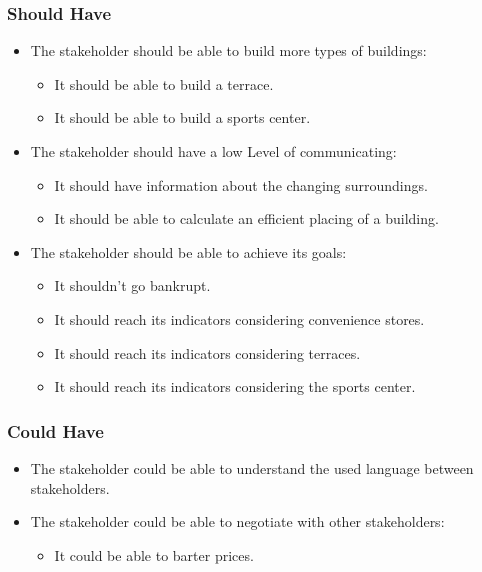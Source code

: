 \subsubsection{Should Have}
\begin{itemize}
	\item The stakeholder should be able to build more types of buildings:
	\begin{itemize}
		\item It should be able to build a terrace.
		\item It should be able to build a sports center.
	\end{itemize}
	\item The stakeholder should have a low Level of communicating:
	\begin{itemize}
		\item It should have information about the changing surroundings.
		\item It should be able to calculate an efficient placing of a building.
	\end{itemize}
	\item The stakeholder should be able to achieve its goals:
	\begin{itemize}
		\item It shouldn't go bankrupt.
		\item It should reach its indicators considering convenience stores.
		\item It should reach its indicators considering terraces.
		\item It should reach its indicators considering the sports center.
	\end{itemize}
\end{itemize}

\subsubsection{Could Have}
\begin{itemize}
	\item The stakeholder could be able to understand the used language between stakeholders.
	\item The stakeholder could be able to negotiate with other stakeholders:
	\begin{itemize}
		\item It could be able to barter prices.
	\end{itemize}
\end{itemize}


